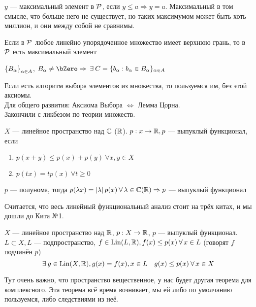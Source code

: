 \documentclass[document]{subfiles}
\begin{document}
\begin{definition}
    $y$ --- максимальный элемент в $\mathcal{P}$, если $y \leq a \Rightarrow y = a$.
    Максимальный в том смысле, что больше него не существует, но таких максимумом может быть хоть миллион, и они между собой не сравнимы.
\end{definition}


\begin{lemma*}[Цорн]
    Если в $\mathcal{P}$ любое линейно упорядоченное множество имеет верхнюю грань, то в $\mathcal{P}$ есть максимальный элемент
\end{lemma*}

\begin{axiom*}[Выбора]
    $\left\{B_\alpha\right\}_{\alpha \in A}$, $B_\alpha \ne \bZero \Rightarrow \: \exists C = \{ b_\alpha: b_\alpha \in B_\alpha \}_{\alpha \in A}$
\end{axiom*}
Если есть алгоритм выбора элементов из множества, то пользуемся им, без этой аксиомы. \\

Для общего развития: Аксиома Выбора $\Leftrightarrow$ Лемма Цорна. \\ 
Закончили с ликбезом по теории множеств.

\begin{definition}
    $X$ --- линейное пространство над $\mathbb{C}$ ($\mathbb{R}$). $p: x \rightarrow \mathbb{R}, p$ --- выпуклый функционал, если 
    \begin{enumerate}
        \item $p(x+y) \leq p(x) + p(y) \: \forall x,y \in X$ 
        \item $p(tx) = tp(x) \: \forall t \geq 0$
    \end{enumerate} 
\end{definition}

\begin{remark}
    $p$ --- полунома, тогда $p(\lambda x) = \abs{\lambda} p(x) \: \forall \lambda \in \bC (\bR) \Rightarrow p$ --- выпуклый функционал
\end{remark}

Считается, что весь линейный функциональный анализ стоит на трёх китах, и мы дошли до Кита №1.
\begin{theorem}
    $X$ --- линейное пространство над $\mathbb{R}$, $p: X \rightarrow \mathbb{R}$, $p$ --- выпуклый функционал.
    $L \subset X, L$ --- подпространство, $f \in \Lin(L, \bR), f(x) \leq p(x) \: \forall x \in L$ (говорят $f$ подчинён $p$)
    \[ \exists g \in \Lin(X, \bR), g(x) = f(x), x \in L \quad g(x) \leq p(x) \: \forall x \in X \]
\end{theorem}
Тут очень важно, что пространство вещественное, у нас будет другая теорема для комплексного. Эта теорема всё время возникает, мы ей либо по умолчанию пользуемся, либо следствиями из неё.
\end{document}
